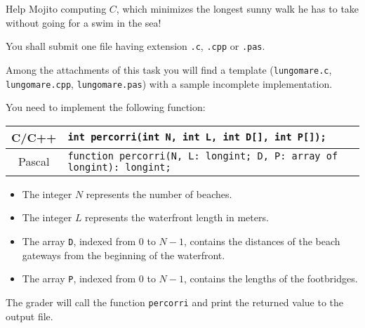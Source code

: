 	Help Mojito computing $C$, which minimizes the longest sunny walk he has to take without going for a swim in the sea!
	

\pagebreak

\Implementation

You shall submit one file having extension \texttt{.c}, \texttt{.cpp} or \texttt{.pas}.

\begin{warning}
Among the attachments of this task you will find a template (\texttt{lungomare.c}, \texttt{lungomare.cpp}, \texttt{lungomare.pas}) with a sample incomplete implementation.
\end{warning}

You need to implement the following function:

\begin{center}\begin{tabularx}{\textwidth}{|c|X|}
\hline
C/C++  & \verb|int percorri(int N, int L, int D[], int P[]);|\\
\hline
Pascal  & \verb|function percorri(N, L: longint; D, P: array of longint): longint;|\\
\hline
\end{tabularx}\end{center}

\begin{itemize}[nolistsep]
  \item The integer $N$ represents the number of beaches.
  \item The integer $L$ represents the waterfront length in meters.
  \item The array \texttt{D}, indexed from $0$ to $N-1$, contains the distances of the beach gateways from the beginning of the waterfront.
  \item The array \texttt{P}, indexed from $0$ to $N-1$, contains the lengths of the footbridges.
\end{itemize}

\medskip


The grader will call the function \texttt{percorri} and print the returned value to the output file.



